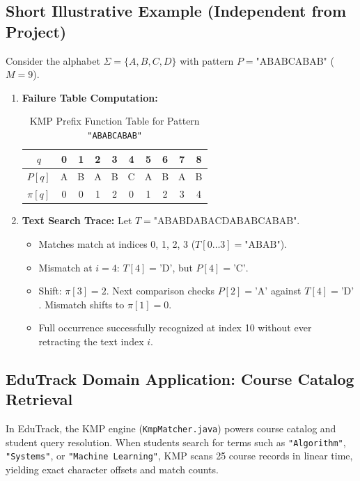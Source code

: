 \subsection{Short Illustrative Example (Independent from Project)}
Consider the alphabet $\Sigma = \{A, B, C, D\}$ with pattern $P = \text{"ABABCABAB"}$ ($M = 9$).
\begin{enumerate}
    \item \textbf{Failure Table Computation:}
    \begin{table}[H]
    \centering
    \begin{tabular}{c|ccccccccc}
    \toprule
    $q$ & 0 & 1 & 2 & 3 & 4 & 5 & 6 & 7 & 8 \\
    \midrule
    $P[q]$ & A & B & A & B & C & A & B & A & B \\
    $\pi[q]$ & 0 & 0 & 1 & 2 & 0 & 1 & 2 & 3 & 4 \\
    \bottomrule
    \end{tabular}
    \caption{KMP Prefix Function Table for Pattern \texttt{"ABABCABAB"}}
    \label{tab:kmp_example_pi}
    \end{table}
    \item \textbf{Text Search Trace:}
    Let $T = \text{"ABABDABACDABABCABAB"}$.
    \begin{itemize}
        \item Matches match at indices 0, 1, 2, 3 ($T[0\dots 3] = \text{"ABAB"}$).
        \item Mismatch at $i = 4$: $T[4] = \text{'D'}$, but $P[4] = \text{'C'}$.
        \item Shift: $\pi[3] = 2$. Next comparison checks $P[2] = \text{'A'}$ against $T[4] = \text{'D'}$. Mismatch shifts to $\pi[1] = 0$.
        \item Full occurrence successfully recognized at index 10 without ever retracting the text index $i$.
    \end{itemize}
\end{enumerate}

\subsection{EduTrack Domain Application: Course Catalog Retrieval}
In EduTrack, the KMP engine (\texttt{KmpMatcher.java}) powers course catalog and student query resolution. When students search for terms such as \texttt{"Algorithm"}, \texttt{"Systems"}, or \texttt{"Machine Learning"}, KMP scans 25 course records in linear time, yielding exact character offsets and match counts.

